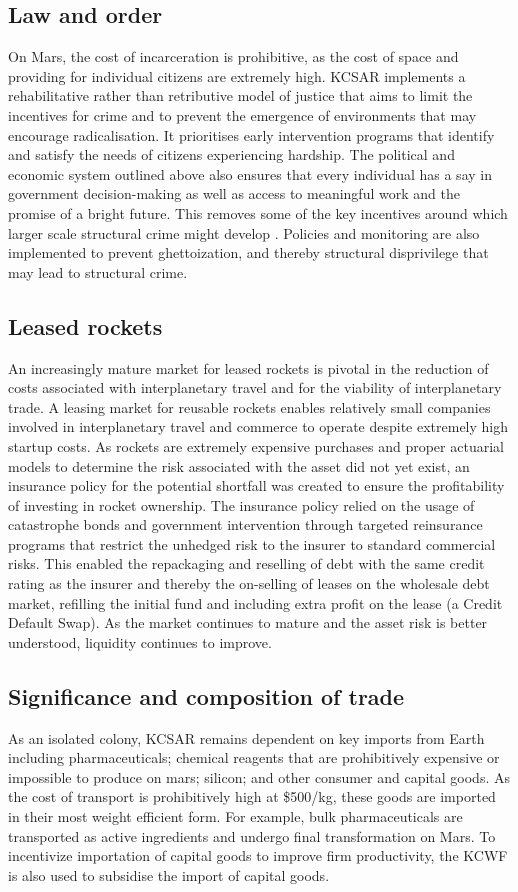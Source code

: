 \documentclass[fleqn,10pt]{Stylesheet} %
\begin{document}
\subsection{Law and order}
On Mars, the cost of incarceration is prohibitive, as the cost of space and providing for individual citizens are extremely high. KCSAR implements a rehabilitative rather than retributive model of justice that aims to limit the incentives for crime and to prevent the emergence of environments that may encourage radicalisation. It prioritises early intervention programs that identify and satisfy the needs of citizens experiencing hardship. The political and economic system outlined above also ensures that every individual has a say in government decision-making as well as access to meaningful work and the promise of a bright future. This removes some of the key incentives around which larger scale structural crime might develop \cite{10.1093/bjc/azq067}. Policies and monitoring are also implemented to prevent ghettoization, and thereby structural disprivilege that may lead to structural crime. 

\subsection{Leased rockets}
An increasingly mature market for leased rockets is pivotal in the reduction of costs associated with interplanetary travel and for the viability of interplanetary trade. A leasing market for reusable rockets enables relatively small companies involved in interplanetary travel and commerce to operate despite extremely high startup costs. As rockets are extremely expensive purchases and proper actuarial models to determine the risk associated with the asset did not yet exist, an insurance policy for the potential shortfall was created to ensure the profitability of investing in rocket ownership. The insurance policy relied on the usage of catastrophe bonds and government intervention through targeted reinsurance programs that restrict the unhedged risk to the insurer to standard commercial risks. This enabled the repackaging and reselling of debt with the same credit rating as the insurer and thereby the on-selling of leases on the wholesale debt market, refilling the initial fund and including extra profit on the lease (a Credit Default Swap). As the market continues to mature and the asset risk is better understood, liquidity continues to improve.

\subsection{Significance and composition of trade}
As an isolated colony, KCSAR remains dependent on key imports from Earth including pharmaceuticals; chemical reagents that are prohibitively expensive or impossible to produce on mars; silicon; and other consumer and capital goods. As the cost of transport is prohibitively high at \$500/kg, these goods are imported in their most weight efficient form. For example, bulk pharmaceuticals are transported as active ingredients and undergo final transformation on Mars. To incentivize importation of capital goods to improve firm productivity, the KCWF is also used to subsidise the import of capital goods. 
\end{document}
